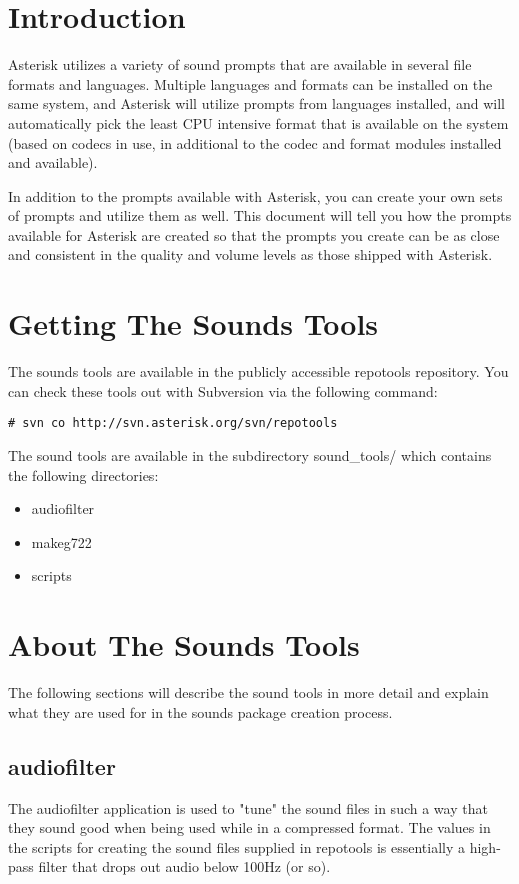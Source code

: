 \section{Introduction}
Asterisk utilizes a variety of sound prompts that are available in several file
formats and languages. Multiple languages and formats can be installed on the 
same system, and Asterisk will utilize prompts from languages installed, and 
will automatically pick the least CPU intensive format that is available on the
system (based on codecs in use, in additional to the codec and format modules
installed and available).

In addition to the prompts available with Asterisk, you can create your own sets
of prompts and utilize them as well. This document will tell you how the prompts
available for Asterisk are created so that the prompts you create can be as close
and consistent in the quality and volume levels as those shipped with Asterisk.

\section{Getting The Sounds Tools}
The sounds tools are available in the publicly accessible repotools repository.
You can check these tools out with Subversion via the following command:

\begin{astlisting}
\begin{verbatim}
# svn co http://svn.asterisk.org/svn/repotools
\end{verbatim}
\end{astlisting}

The sound tools are available in the subdirectory sound_tools/ which contains the
following directories:

\begin{itemize}
\item audiofilter
\item makeg722
\item scripts
\end{itemize}

\section{About The Sounds Tools}
The following sections will describe the sound tools in more detail and explain what
they are used for in the sounds package creation process.

\subsection{audiofilter}
The audiofilter application is used to "tune" the sound files in such a way that
they sound good when being used while in a compressed format. The values in the
scripts for creating the sound files supplied in repotools is essentially a
high-pass filter that drops out audio below 100Hz (or so).


